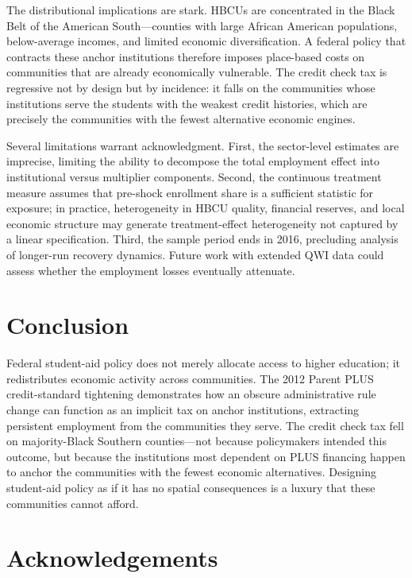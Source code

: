 \documentclass[12pt]{article}
\begin{document}
The distributional implications are stark. HBCUs are concentrated in the Black Belt of the American South---counties with large African American populations, below-average incomes, and limited economic diversification. A federal policy that contracts these anchor institutions therefore imposes place-based costs on communities that are already economically vulnerable. The credit check tax is regressive not by design but by incidence: it falls on the communities whose institutions serve the students with the weakest credit histories, which are precisely the communities with the fewest alternative economic engines.

Several limitations warrant acknowledgment. First, the sector-level estimates are imprecise, limiting the ability to decompose the total employment effect into institutional versus multiplier components. Second, the continuous treatment measure assumes that pre-shock enrollment share is a sufficient statistic for exposure; in practice, heterogeneity in HBCU quality, financial reserves, and local economic structure may generate treatment-effect heterogeneity not captured by a linear specification. Third, the sample period ends in 2016, precluding analysis of longer-run recovery dynamics. Future work with extended QWI data could assess whether the employment losses eventually attenuate.

\section{Conclusion}
\label{sec:conclusion}

Federal student-aid policy does not merely allocate access to higher education; it redistributes economic activity across communities. The 2012 Parent PLUS credit-standard tightening demonstrates how an obscure administrative rule change can function as an implicit tax on anchor institutions, extracting persistent employment from the communities they serve. The credit check tax fell on majority-Black Southern counties---not because policymakers intended this outcome, but because the institutions most dependent on PLUS financing happen to anchor the communities with the fewest economic alternatives. Designing student-aid policy as if it has no spatial consequences is a luxury that these communities cannot afford.

\section*{Acknowledgements}
\end{document}
